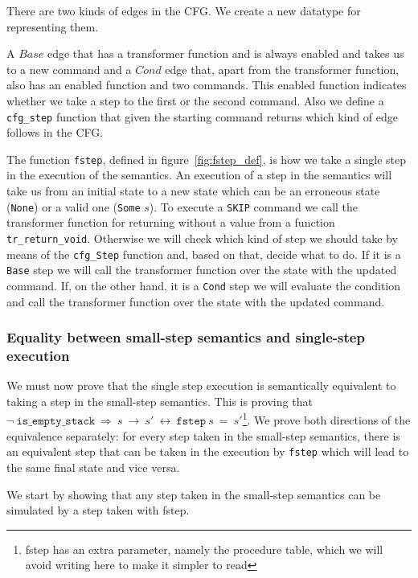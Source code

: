 There are two kinds of edges in the CFG.
We create a new datatype for representing them.


A $Base$ edge that has a transformer function and is always enabled and takes us to a new command and a $Cond$ edge that, apart from the transformer function, also has an enabled function and two commands.
This enabled function indicates whether we take a step to the first or the second command.
Also we define a \verb|cfg_step| function that given the starting command returns which kind of edge follows in the CFG.

The function \verb|fstep|, defined in figure~\ref{fig:fstep_def}, is how we take a single step in the execution of the semantics.
An execution of a step in the semantics will take us from an initial state to a new state which can be an erroneous state (\verb|None|) or a valid one (\verb|Some| $s$).
To execute a \verb|SKIP| command we call the transformer function for returning without a value from a function \verb|tr_return_void|.
Otherwise we will check which kind of step we should take by means of the \verb|cfg_Step| function and, based on that, decide what to do.
If it is a \verb|Base| step we will call the transformer function over the state with the updated command.
If, on the other hand, it is a \verb|Cond| step we will evaluate the condition and call the transformer function over the state with the updated command.

\subsubsection{Equality between small-step semantics and single-step execution}\label{subsubsection:equality_ss_ss}

We must now prove that the single step execution is semantically equivalent to taking a step in the small-step semantics.
This is proving that $\neg\ \mathtt{is\_empty\_stack}\ \Longrightarrow\ s\ \rightarrow\ s'\ \longleftrightarrow\ \mathtt{fstep}\ s\ =\ s'$\footnote{fstep has an extra parameter, namely the procedure table, which we will avoid writing here to make it simpler to read}.
We prove both directions of the equivalence separately: for every step taken in the small-step semantics, there is an equivalent step that can be taken in the execution by \verb|fstep| which will lead to the same final state and vice versa.


We start by showing that any step taken in the small-step semantics can be simulated by a step taken with fstep.

